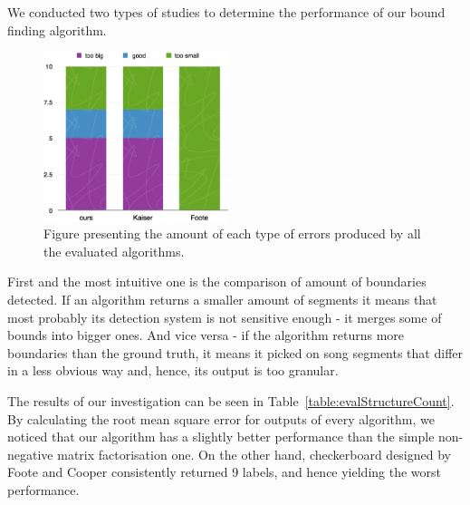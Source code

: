 We conducted two types of studies to determine the performance of our bound finding algorithm.

\begin{figure}
\vspace{-10pt}
  \begin{center}
    \includegraphics[width=0.48\textwidth]{Figures/count}
  \end{center}
  \caption{Figure presenting the amount of each type of errors produced by all the evaluated algorithms.}
\label{fig:boundcount}
\end{figure}


First and the most intuitive one is the comparison of amount of boundaries detected. If an algorithm returns a smaller amount of segments it means that most probably its detection system is not sensitive enough - it merges some of bounds into bigger ones. And vice versa - if the algorithm returns more boundaries than the ground truth, it means it picked on song segments that differ in a less obvious way and, hence, its output is too granular.

The results of our investigation can be seen in Table~\ref{table:evalStructureCount}. By calculating the root mean square error for outputs of every algorithm, we noticed that our algorithm has a slightly better performance than the simple non-negative matrix factorisation one. On the other hand, checkerboard designed by Foote and Cooper consistently returned 9 labels, and hence yielding the worst performance.


